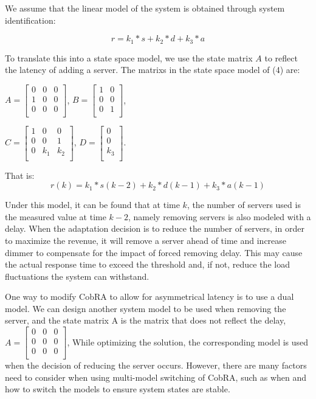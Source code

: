 \documentclass[sigconf]{acmart}
\begin{document}
We assume that the linear model of the system is obtained through system identification: 

\begin{equation}
r=k_1 *s+k_2 *d+k_3*a
\end{equation}

To translate this into a state space model, we use the state matrix $A$ to reflect the latency of adding a server. The matrixs in the state space model of (4) are:

$A={\left[\begin{array}{ccc}
	0&0&0\\
	1&0&0\\
	0&0&0\\
	\end{array}
	\right]
}$, $B={\left[\begin{array}{ccc}
	1&0\\0&0\\
	0&1\\
	\end{array}
	\right]}$,

$C={\left[\begin{array}{ccc}
	1&0&0\\
	0&0&1\\
	0&k_1&k_2\\
	\end{array}
	\right]
}$, $D={\left[\begin{array}{ccc}
	0\\
	0\\
	k_3\\
	\end{array}
	\right]
}$.

\noindent That is: 
\begin{equation}
r(k)=k_1 *s(k-2)+k_2 *d(k-1)+k_3*a(k-1)
\end{equation}

Under this model, it can be found that at time $k$, the number of servers used is the measured value at time $k-2$, namely removing servers is also modeled with a delay. When the adaptation decision is to reduce the number of servers, in order to maximize the revenue, it will remove a server ahead of time and increase dimmer to compensate for the impact of  forced removing delay. This may cause the actual response time to exceed the threshold and, if not, reduce the load fluctuations the system can withstand.

One way to modify CobRA to allow for asymmetrical latency is to use a dual model. We can design another system model to be used when removing the server, and the state matrix A is the matrix that does not reflect the delay, $A={\left[\begin{array}{ccc}
	0&0&0\\
	0&0&0\\
	0&0&0\\
	\end{array}
	\right]
}$, While optimizing the solution, the corresponding model is used when the decision of reducing the server occurs. 
However, there are many factors need to consider when using multi-model switching of CobRA, such as when and how to switch the models to ensure system states are stable. 
\end{document}
